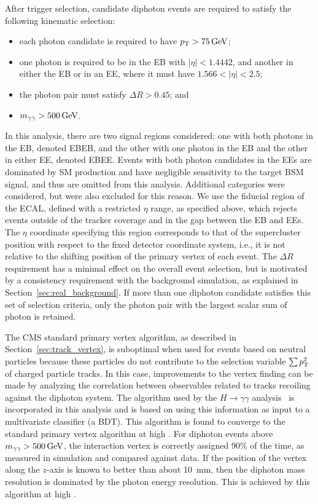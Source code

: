 After trigger selection, candidate diphoton events are required to satisfy the following kinematic selection:
\begin{itemize}
	\item{each photon candidate is required to have $p_{\mathrm{T}}>75\,\text{Ge\hspace{-.08em}V}$;}
	\item{one photon is required to be in the EB with $|\eta| < 1.4442$, and another in either the EB or in an EE, where it must have $1.566 < |\eta| < 2.5$;}
	\item{the photon pair must satisfy $\Delta R > 0.45$; and}
	\item{$m_{\gamma\gamma}>500\,\text{Ge\hspace{-.08em}V}$.}
\end{itemize}
 In this analysis, there are two signal regions considered: one with both photons in the EB, denoted EBEB, and the other with one photon in the EB and the other in either EE, denoted EBEE. Events with both photon candidates in the EEs are dominated by SM production and have negligible sensitivity to the target BSM signal, and thus are omitted from this analysis. Additional categories were considered, but were also excluded for this reason. We use the fiducial region of the ECAL, defined with a restricted $\eta$ range, as specified above, which rejects events outside of the tracker coverage and in the gap between the EB and EEs. The $\eta$ coordinate specifying this region corresponds to that of the supercluster position with respect to the fixed detector coordinate system, i.e., it is not relative to the shifting position of the primary vertex of each event. The $\Delta R$ requirement has a minimal effect on the overall event selection, but is motivated by a consistency requirement with the background simulation, as explained in Section~\ref{sec:real_background}. If more than one diphoton candidate satisfies this set of selection criteria, only the photon pair with the largest scalar sum of photon \pt is retained. 

The CMS standard primary vertex algorithm, as described in Section~\ref{sec:track_vertex}, is suboptimal when used for events based on neutral particles because these particles do not contribute to the selection variable $\sum{\pt^2}$ of charged particle tracks. In this case, improvements to the vertex finding can be made by analyzing the correlation between observables related to tracks recoiling against the diphoton system. The algorithm used by the $H \to \gamma\gamma$ analysis~\cite{Khachatryan:2014ira,Sirunyan:2018ouh} is incorporated in this analysis and is based on using this information as input to a multivariate classifier (a BDT). This algorithm is found to converge to the standard primary vertex algorithm at high \mgg. For diphoton events above $m_{\gamma\gamma}>500\,\text{Ge\hspace{-.08em}V}$, the interaction vertex is correctly assigned 90\% of the time, as measured in simulation and compared against data. If the position of the vertex along the $z$-axis is known to better than about 10~mm, then the diphoton mass resolution is dominated by the photon energy resolution. This is achieved by this algorithm at high \mgg.


